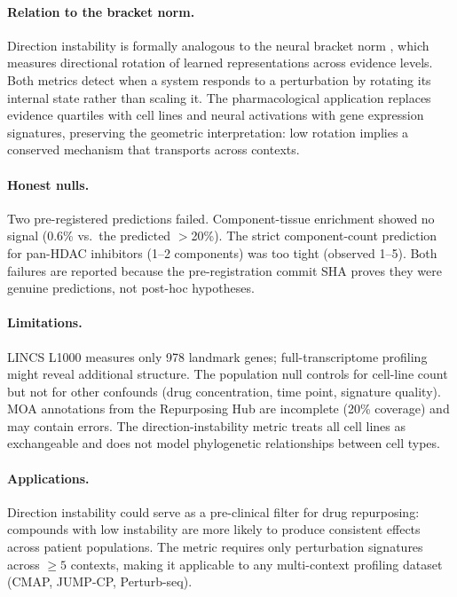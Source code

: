 \documentclass[11pt]{article}
\begin{document}
\paragraph{Relation to the bracket norm.}
Direction instability is formally analogous to the neural bracket norm
\citep{tower2026bracket}, which measures directional rotation of
learned representations across evidence levels. Both metrics detect when a
system responds to a perturbation by rotating its internal state rather
than scaling it. The pharmacological application replaces evidence
quartiles with cell lines and neural activations with gene expression
signatures, preserving the geometric interpretation: low rotation implies
a conserved mechanism that transports across contexts.

\paragraph{Honest nulls.}
Two pre-registered predictions failed. Component-tissue enrichment
showed no signal (0.6\% vs.\ the predicted $>$20\%). The strict
component-count prediction for pan-HDAC inhibitors (1--2 components)
was too tight (observed 1--5). Both failures are reported because
the pre-registration commit SHA proves they were genuine predictions,
not post-hoc hypotheses.

\paragraph{Limitations.}
LINCS L1000 measures only 978 landmark genes; full-transcriptome profiling
might reveal additional structure. The population null controls for
cell-line count but not for other confounds (drug concentration, time point,
signature quality). MOA annotations from the Repurposing Hub are incomplete
(20\% coverage) and may contain errors. The direction-instability metric
treats all cell lines as exchangeable and does not model phylogenetic
relationships between cell types.

\paragraph{Applications.}
Direction instability could serve as a pre-clinical filter for drug
repurposing: compounds with low instability are more likely to produce
consistent effects across patient populations. The metric requires only
perturbation signatures across $\geq5$ contexts, making it applicable to
any multi-context profiling dataset (CMAP, JUMP-CP, Perturb-seq).



\end{document}
